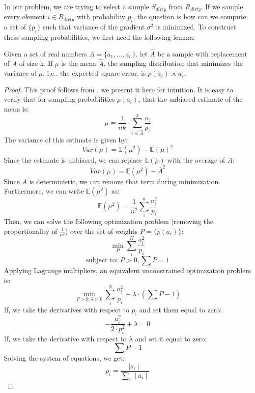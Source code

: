 In our problem, we are trying to select a sample $S_{dirty}$ from $R_{dirty}$.
If we sample every element $i \in R_{dirty}$ with probability $p_i$, the question is
how can we compute a set of $\{p_i\}$ such that variance of the gradient $\sigma^2$ is minimized.  
To construct these sampling probabilities, we first need the following lemma:
\begin{lemma}\label{impsample}
Given a set of real numbers $A = \{a_1,...,a_n\}$, let $\hat{A}$ be 
a sample with replacement of $A$ of size k.
If $\mu$ is the mean $\hat{A}$, the sampling distribution that minimizes
 the variance of $\mu$, i.e., the expected square error, is $p(a_i) \propto a_i$.
\end{lemma}
\begin{proof}
This proof follows from \cite{mcbook}, we present it here for intuition.
It is easy to verify that for sampling probabilities $p(a_i)$, that the unbiased
estimate of the mean is:
\[
\mu = \frac{1}{nk}\cdot\sum_{i\in\hat{A}}^k \frac{a_i}{p_i}
\]
The variance of this estimate is given by:
\[
Var(\mu) = \mathbb{E}(\mu^2)-\mathbb{E}(\mu)^2
\] 
Since the estimate is unbiased, we can replace $\mathbb{E}(\mu)$ with the average of $A$:
\[
Var(\mu) = \mathbb{E}(\mu^2)-\bar{A}^2
\]
Since $\bar{A}$ is deterministic, we can remove that term during minimization.
Furthermore, we can write $\mathbb{E}(\mu^2)$ as:
\[
\mathbb{E}(\mu^2) = \frac{1}{n^2}\sum_i^n \frac{a_i^2}{p_i}
\]
Then, we can solve the following optimization problem (removing the proportionality of $\frac{1}{n^2}$) over the set of weights $P=\{p(a_i)\}$:
\[
\min_{P} \sum_i^N \frac{a_i^2}{p_i}
\]
\[
\text{subject to: } P > 0, \sum P = 1
\]
Applying Lagrange multipliers, an equivalent unconstrained optimization problem is:
\[
\min_{P > 0,\lambda > 0} \sum_i^N \frac{a_i^2}{p_i} + \lambda \cdot (\sum P - 1)
\]
If, we take the derivatives with respect to $p_i$ and set them equal to zero:
\[
-\frac{a_i^2}{2 \cdot p_i^2} + \lambda = 0
\]
If, we take the derivative with respect to $\lambda$ and set it equal to zero:
\[
\sum P - 1
\]
Solving the system of equations, we get:
\[
p_i = \frac{\mid a_i \mid }{\sum_i \mid a_i \mid}
\]
\end{proof}


